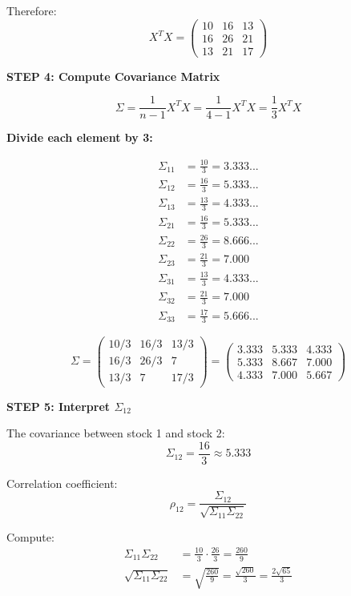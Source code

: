 \documentclass[12pt]{article}
\begin{document}
\begin{solution}
Therefore:
\[
X^T X = \begin{pmatrix}
10 & 16 & 13 \\
16 & 26 & 21 \\
13 & 21 & 17
\end{pmatrix}
\]

\textbf{STEP 4: Compute Covariance Matrix}

\[
\Sigma = \frac{1}{n-1} X^T X = \frac{1}{4-1} X^T X = \frac{1}{3} X^T X
\]

\textbf{Divide each element by 3:}

\begin{align*}
\Sigma_{11} &= \frac{10}{3} = 3.333... \\
\Sigma_{12} &= \frac{16}{3} = 5.333... \\
\Sigma_{13} &= \frac{13}{3} = 4.333... \\
\Sigma_{21} &= \frac{16}{3} = 5.333... \\
\Sigma_{22} &= \frac{26}{3} = 8.666... \\
\Sigma_{23} &= \frac{21}{3} = 7.000 \\
\Sigma_{31} &= \frac{13}{3} = 4.333... \\
\Sigma_{32} &= \frac{21}{3} = 7.000 \\
\Sigma_{33} &= \frac{17}{3} = 5.666...
\end{align*}

\[
\boxed{\Sigma = \begin{pmatrix}
10/3 & 16/3 & 13/3 \\
16/3 & 26/3 & 7 \\
13/3 & 7 & 17/3
\end{pmatrix} = \begin{pmatrix}
3.333 & 5.333 & 4.333 \\
5.333 & 8.667 & 7.000 \\
4.333 & 7.000 & 5.667
\end{pmatrix}}
\]

\textbf{STEP 5: Interpret $\Sigma_{12}$}

The covariance between stock 1 and stock 2:
\[
\Sigma_{12} = \frac{16}{3} \approx 5.333
\]

Correlation coefficient:
\[
\rho_{12} = \frac{\Sigma_{12}}{\sqrt{\Sigma_{11} \Sigma_{22}}}
\]

Compute:
\begin{align*}
\Sigma_{11} \Sigma_{22} &= \frac{10}{3} \cdot \frac{26}{3} = \frac{260}{9} \\
\sqrt{\Sigma_{11} \Sigma_{22}} &= \sqrt{\frac{260}{9}} = \frac{\sqrt{260}}{3} = \frac{2\sqrt{65}}{3}
\end{align*}


\end{solution}
\end{document}

